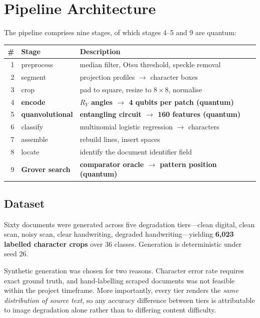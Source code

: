 \documentclass[11pt,a4paper]{article}
\begin{document}
\section{Pipeline Architecture}
\label{sec:pipeline}

The pipeline comprises nine stages, of which stages 4--5 and 9 are quantum:

\begin{center}
\small
\begin{tabular}{@{}rll@{}}
\toprule
\# & Stage & Description \\
\midrule
1 & preprocess & median filter, Otsu threshold, speckle removal \\
2 & segment & projection profiles $\rightarrow$ character boxes \\
3 & crop & pad to square, resize to $8\times8$, normalise \\
4 & \textbf{encode} & \textbf{$R_Y$ angles $\rightarrow$ 4 qubits per patch (quantum)} \\
5 & \textbf{quanvolutional} & \textbf{entangling circuit $\rightarrow$ 160 features (quantum)} \\
6 & classify & multinomial logistic regression $\rightarrow$ characters \\
7 & assemble & rebuild lines, insert spaces \\
8 & locate & identify the document identifier field \\
9 & \textbf{Grover search} & \textbf{comparator oracle $\rightarrow$ pattern position (quantum)} \\
\bottomrule
\end{tabular}
\end{center}

\subsection{Dataset}

Sixty documents were generated across five degradation tiers---clean digital,
clean scan, noisy scan, clear handwriting, degraded handwriting---yielding
\textbf{6{,}023 labelled character crops} over 36 classes. Generation is
deterministic under seed 26.

Synthetic generation was chosen for two reasons. Character error rate requires
exact ground truth, and hand-labelling scraped documents was not feasible within
the project timeframe. More importantly, every tier renders the \emph{same
distribution of source text}, so any accuracy difference between tiers is
attributable to image degradation alone rather than to differing content
difficulty.
\end{document}
